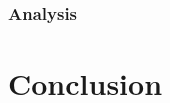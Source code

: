 \documentclass[twoside]{article}
\theoremstyle{definition}
\begin{document}
\subsubsection{Analysis}


\section{Conclusion}










\end{document}
